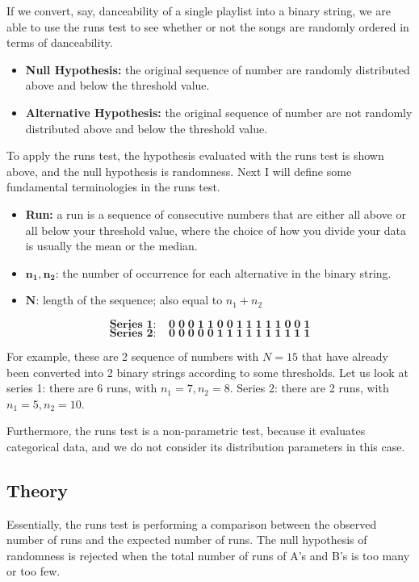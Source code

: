\documentclass[12pt]{article}
\theoremstyle{plain}
\theoremstyle{definition}
\theoremstyle{remark}
\begin{document}
If we convert, say, danceability of a single playlist into a binary string, we are able to use the runs test to see whether or not the songs are randomly ordered in terms of danceability.

\begin{itemize}
    \item \textbf{Null Hypothesis:} the original sequence of number are randomly distributed above and below the threshold value.
    \item \textbf{Alternative Hypothesis:} the original sequence of number are not randomly distributed above and below the threshold value.
\end{itemize}

To apply the runs test, the hypothesis evaluated with the runs test is shown above, and the null hypothesis is randomness. Next I will define some fundamental terminologies in the runs test.

\begin{itemize}
    \item \textbf{Run:} a run is a sequence of consecutive numbers that are either all above or all below your threshold value, where the choice of how you divide your data is usually the mean or the median. 
    \item $\mathbf{n_1},\mathbf{n_2}$: the number of occurrence for each alternative in the binary string.
    \item $\mathbf N$: length of the sequence; also equal to $n_1+n_2$
\end{itemize}

\[\mathbf{\textbf{Series 1:}\;\;\;\;0\;0\;0\;1\;1\;0\;0\;1\;1\;1\;1\;1\;0\;0\;1}\]
\[\mathbf{\textbf{Series 2:}\;\;\;\;0\;0\;0\;0\;0\;1\;1\;1\;1\;1\;1\;1\;1\;1\;1}\]

For example, these are 2 sequence of numbers with $N=15$ that have already been converted into 2 binary strings according to some thresholds. Let us look at series 1: there are 6 runs, with $n_1=7,n_2=8$. Series 2: there are 2 runs, with $n_1=5,n_2=10$.

Furthermore, the runs test is a non-parametric test, because it evaluates categorical data, and we do not consider its distribution parameters in this case.

\newpage
\subsection{Theory}
Essentially, the runs test is performing a comparison between the observed number of runs and the expected number of runs. The null hypothesis of randomness is rejected when the total number of runs of A’s and B’s is too many or too few. 
\end{document}
